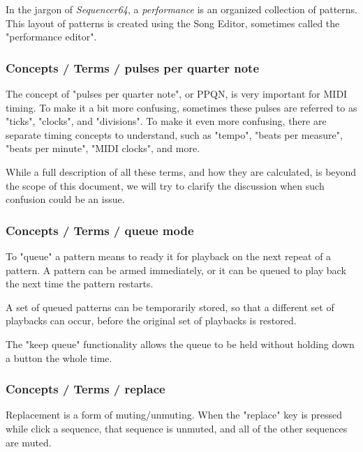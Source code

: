    In the jargon of \textsl{Sequencer64}, a
   \textsl{performance} is an organized collection of patterns.
   This layout of patterns is created using the Song Editor, sometimes
   called the "performance editor".

\subsubsection{Concepts / Terms / pulses per quarter note}
\label{subsubsec:concepts_terms_pulses}

   The concept of "pulses per quarter note", or PPQN, is very important for
   MIDI timing.  To make it a bit more confusing, sometimes these pulses are
   referred to as "ticks", "clocks", and "divisions".
   To make it even more confusing, there are separate timing concepts to
   understand, such as "tempo", "beats per measure", "beats per minute",
   "MIDI clocks", and more.

   While a full description of all these terms, and how they are calculated, is
   beyond the scope of this document, we will try to clarify the discussion
   when such confusion could be an issue.

\subsubsection{Concepts / Terms / queue mode}
\label{subsubsec:concepts_terms_queue_mode}

   To "queue" a pattern means to ready it for playback on the next repeat of
   a pattern.  A pattern can be armed immediately, or it can be queued to
   play back the next time the pattern restarts.

   A set of queued patterns can be temporarily stored, so that a different
   set of playbacks can occur, before the original set of playbacks is
   restored.

   The "keep queue" functionality allows the queue to be held without
   holding down a button the whole time.

\subsubsection{Concepts / Terms / replace}
\label{subsubsec:concepts_terms_replace}

   Replacement is a form of muting/unmuting.  When the "replace" key is
   pressed while click a sequence, that sequence is unmuted, and all of the
   other sequences are muted.

